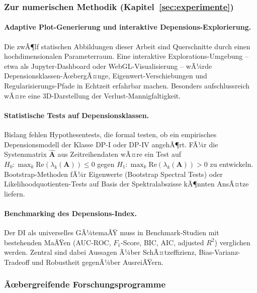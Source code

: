 ﻿\documentclass[12pt, a4paper]{article}
\theoremstyle{definition}
\theoremstyle{remark}
\newcommand{\vA}{\bm{A}}
\newcommand{\re}{\mathrm{Re}}
\begin{document}
\subsubsection{Zur numerischen Methodik (Kapitel~\ref{sec:experimente})}

\paragraph{Adaptive Plot-Generierung und interaktive Depensions-Explorierung.}
Die zwÃ¶lf statischen Abbildungen dieser Arbeit sind Querschnitte durch einen
hochdimensionalen Parameterraum. Eine interaktive Explorations-Umgebung --
etwa als Jupyter-Dashboard oder WebGL-Visualisierung -- wÃ¼rde Depensions\-klassen-ÃœbergÃ¤nge,
Eigenwert-Verschiebungen und Regularisierungs-Pfade in Echtzeit erfahrbar machen.
Besonders aufschlussreich wÃ¤re eine 3D-Darstellung der Verlust-Mannigfaltigkeit.

\paragraph{Statistische Tests auf Depensionsklassen.}
Bislang fehlen Hypothesentests, die formal testen, ob ein empirisches Depensionsmodell
der Klasse DP-I oder DP-IV angehÃ¶rt. FÃ¼r die Systemmatrix $\hat{\vA}$ aus Zeitreihendaten
wÃ¤re ein Test auf $H_0\colon \max_k\re(\lambda_k(\vA)) \leq 0$ gegen
$H_1\colon \max_k\re(\lambda_k(\vA)) > 0$ zu entwickeln. Bootstrap-Methoden
fÃ¼r Eigenwerte (Bootstrap Spectral Tests) oder Likelihoodquotienten-Tests
auf Basis der Spektralabszisse kÃ¶nnten AnsÃ¤tze liefern.

\paragraph{Benchmarking des Depensions-Index.}
Der DI als universelles GÃ¼temaÃŸ muss in Benchmark-Studien mit bestehenden
MaÃŸen (AUC-ROC, $F_1$-Score, BIC, AIC, adjusted $R^2$) verglichen werden.
Zentral sind dabei Aussagen Ã¼ber SchÃ¤tzeffizienz, Bias-Varianz-Tradeoff
und Robustheit gegenÃ¼ber AusreiÃŸern.

\subsubsection{Ãœbergreifende Forschungsprogramme}
\end{document}
